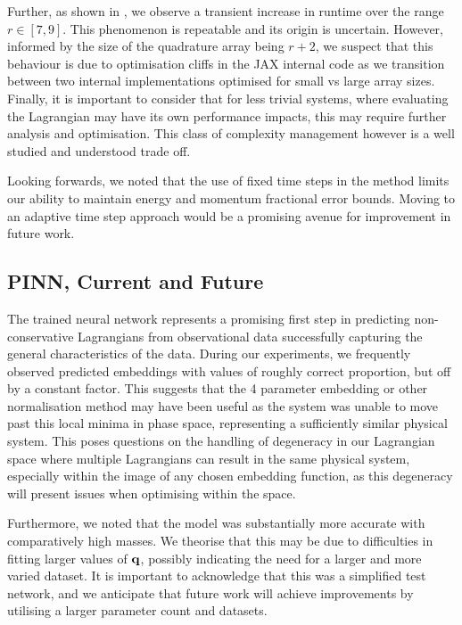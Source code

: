 Further, as shown in , we observe a transient increase in runtime over the range $r \in [7, 9]$. This phenomenon is repeatable and its origin is uncertain. However, informed by the size of the quadrature array being $r + 2$, we suspect that this behaviour is due to optimisation cliffs in the JAX internal code as we transition between two internal implementations optimised for small vs large array sizes. Finally, it is important to consider that for less trivial systems, where evaluating the Lagrangian may have its own performance impacts, this may require further analysis and optimisation.  This class of complexity management however is a well studied and understood trade off.

Looking forwards, we noted that the use of fixed time steps in the method limits our ability to maintain energy and momentum fractional error bounds. Moving to an adaptive time step approach would be a promising avenue for improvement in future work.

\subsection{PINN, Current and Future}

The trained neural network represents a promising first step in predicting non-conservative Lagrangians from observational data successfully capturing the general characteristics of the data.
During our experiments, we frequently observed predicted embeddings with values of roughly correct proportion, but off by a constant factor. This suggests that the 4 parameter embedding or other normalisation method may have been useful as the system was unable to move past this local minima in phase space, representing a sufficiently similar physical system.
This poses questions on the handling of degeneracy in our Lagrangian space where multiple Lagrangians can result in the same physical system, especially within the image of any chosen embedding function, as this degeneracy will present issues when optimising within the space.

Furthermore, we noted that the model was substantially more accurate with comparatively high masses. We theorise that this may be due to difficulties in fitting larger values of $\vb{q}$, possibly indicating the need for a larger and more varied dataset. It is important to acknowledge that this was a simplified test network, and we anticipate that future work will achieve improvements by utilising a larger parameter count and datasets.

